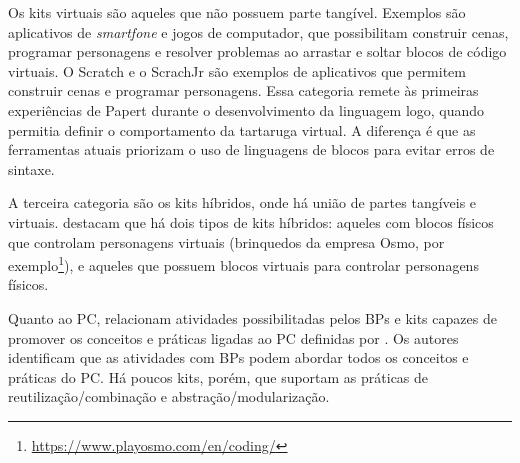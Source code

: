 Os kits virtuais são aqueles que não possuem parte tangível. Exemplos são aplicativos de \textit{smartfone} e jogos de computador, que possibilitam construir cenas, programar personagens e resolver problemas ao arrastar e soltar blocos de código virtuais. O Scratch e o ScrachJr são exemplos de aplicativos que permitem construir cenas e programar personagens. Essa categoria remete às primeiras experiências de Papert durante o desenvolvimento da linguagem logo, quando permitia definir o comportamento da tartaruga virtual. A diferença é que as ferramentas atuais
priorizam o uso de linguagens de blocos para evitar erros de sintaxe.

A terceira categoria são os kits híbridos, onde há união de partes tangíveis e virtuais.  destacam que há dois tipos de kits híbridos: aqueles com blocos físicos que controlam personagens virtuais (brinquedos da empresa Osmo, por exemplo\footnote{\url{https://www.playosmo.com/en/coding/}}), e aqueles que possuem blocos virtuais para controlar personagens físicos.

Quanto ao \acl{PC},  relacionam atividades possibilitadas pelos BPs e kits capazes de promover os conceitos e práticas ligadas ao \ac{PC} definidas por . Os autores identificam que as atividades com BPs podem abordar todos os conceitos e práticas do \ac{PC}. Há poucos kits, porém, que suportam as práticas de reutilização/combinação e abstração/modularização.

